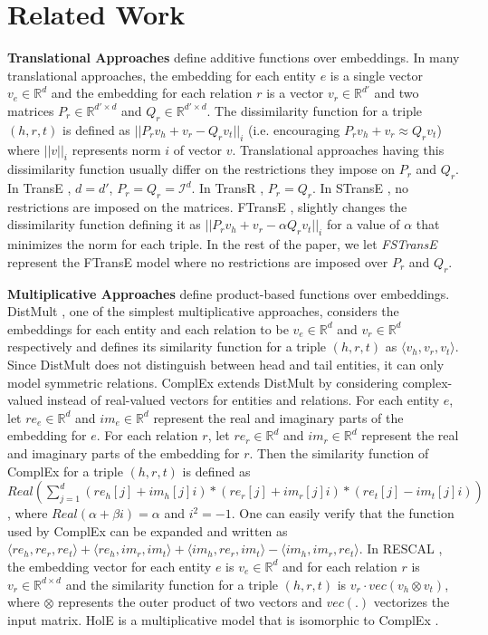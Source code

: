 \documentclass{article}
\newcommand{\triple}[3]{(\mathit{#1}, \mathit{#2}, \mathit{#3})}
\newcommand{\eye}{\ensuremath{\mathcal{I}}}
\begin{document}
\section{Related Work}
\textbf{Translational Approaches} define additive functions over embeddings. In many translational approaches, the embedding for each entity $e$ is a single vector $v_e\in\mathbb{R}^d$ and the embedding for each relation $r$ is a vector $v_r\in\mathbb{R}^{d'}$ and two matrices $P_r\in\mathbb{R}^{d'\times d}$ and $Q_r\in\mathbb{R}^{d'\times d}$. The dissimilarity function for a triple $\triple{h}{r}{t}$ is defined as $||P_r v_h+v_r-Q_r v_t||_i$ (i.e. encouraging $P_r v_h+v_r\approx Q_r v_t$) where $||v||_{i}$ represents norm $i$ of vector $v$. Translational approaches having this dissimilarity function usually differ on the restrictions they impose on $P_r$ and $Q_r$. In TransE \cite{bordes2013translating}, $d=d'$, $P_r=Q_r=\eye^{d}$. In TransR \cite{lin2015learning}, $P_r=Q_r$. In STransE \cite{StransE}, no restrictions are imposed on the matrices. FTransE \cite{feng2016knowledge}, slightly changes the dissimilarity function defining it as $||P_r v_h+v_r-\alpha Q_r v_t||_i$ for a value of $\alpha$ that minimizes the norm for each triple. In the rest of the paper, we let \emph{FSTransE} represent the FTransE model where no restrictions are imposed over $P_r$ and $Q_r$.

\textbf{Multiplicative Approaches} define product-based functions over embeddings. DistMult \cite{yang2014embedding}, one of the simplest multiplicative approaches, considers the embeddings for each entity and each relation to be $v_e\in\mathbb{R}^d$ and $v_r\in\mathbb{R}^d$ respectively and defines its similarity function for a triple $\triple{h}{r}{t}$ as $\langle v_h, v_r, v_t \rangle$. Since DistMult does not distinguish between head and tail entities, it can only model symmetric relations. ComplEx \cite{trouillon2016complex} extends DistMult by considering complex-valued instead of real-valued vectors for entities and relations. For each entity $e$, let $re_e\in\mathbb{R}^d$ and $im_e\in\mathbb{R}^d$ represent the real and imaginary parts of the embedding for $e$. For each relation $r$, let $re_r\in\mathbb{R}^d$ and $im_r\in\mathbb{R}^d$ represent the real and imaginary parts of the embedding for $r$. Then the similarity function of ComplEx for a triple $\triple{h}{r}{t}$ is defined as $Real(\sum_{j=1}^d (re_h[j] + im_h[j] i) * (re_r[j] + im_r[j] i) * (re_t[j] - im_t[j] i))$, where  $Real(\alpha + \beta i) = \alpha$ and $i^2=-1$. One can easily verify that the function used by ComplEx can be expanded and written as $\langle re_h, re_r, re_t \rangle + \langle re_h, im_r, im_t \rangle + \langle im_h, re_r, im_t \rangle - \langle im_h, im_r, re_t \rangle$. In RESCAL \cite{nickel2011three}, the embedding vector for each entity $e$ is $v_e\in\mathbb{R}^d$ and for each relation $r$ is $v_r\in\mathbb{R}^{d\times d}$ and the similarity function for a triple $\triple{h}{r}{t}$ is $v_r \cdot vec(v_h \otimes v_t)$, where $\otimes$ represents the outer product of two vectors and $vec(.)$ vectorizes the input matrix. HolE \cite{nickel2016holographic} is a multiplicative model that is isomorphic to ComplEx \cite{hayashi2017equivalence}.
\end{document}
